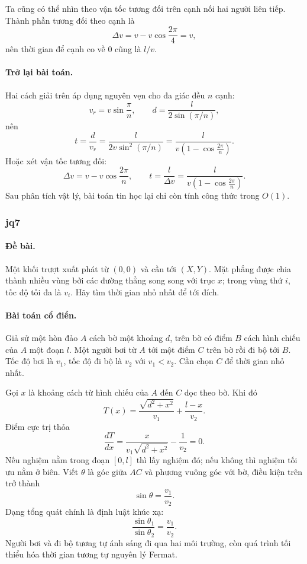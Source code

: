 \documentclass[11pt]{article}
\begin{document}
Ta cũng có thể nhìn theo vận tốc tương đối trên cạnh nối hai người liên tiếp.
Thành phần tương đối theo cạnh là
\[
  \Delta v=v-v\cos\frac{2\pi}{4}=v,
\]
nên thời gian để cạnh co về \(0\) cũng là \(l/v\).

\paragraph{Trở lại bài toán.}
Hai cách giải trên áp dụng nguyên vẹn cho đa giác đều \(n\) cạnh:
\[
  v_r=v\sin\frac{\pi}{n},\qquad
  d=\frac{l}{2\sin(\pi/n)},
\]
nên
\[
  t=\frac{d}{v_r}
    =\frac{l}{2v\sin^2(\pi/n)}
    =\frac{l}{v\left(1-\cos\frac{2\pi}{n}\right)}.
\]
Hoặc xét vận tốc tương đối:
\[
  \Delta v=v-v\cos\frac{2\pi}{n},\qquad
  t=\frac{l}{\Delta v}
    =\frac{l}{v\left(1-\cos\frac{2\pi}{n}\right)}.
\]
Sau phân tích vật lý, bài toán tin học lại chỉ còn tính công thức trong
\(O(1)\).

\subsubsection{jq7}

\paragraph{Đề bài.}
Một khối trượt xuất phát từ \((0,0)\) và cần tới \((X,Y)\). Mặt phẳng được chia
thành nhiều vùng bởi các đường thẳng song song với trục \(x\); trong vùng thứ
\(i\), tốc độ tối đa là \(v_i\). Hãy tìm thời gian nhỏ nhất để tới đích.

\paragraph{Bài toán cổ điển.}
Giả sử một hòn đảo \(A\) cách bờ một khoảng \(d\), trên bờ có điểm \(B\) cách
hình chiếu của \(A\) một đoạn \(l\). Một người bơi từ \(A\) tới một điểm \(C\)
trên bờ rồi đi bộ tới \(B\). Tốc độ bơi là \(v_1\), tốc độ đi bộ là \(v_2\) với
\(v_1<v_2\). Cần chọn \(C\) để thời gian nhỏ nhất.

Gọi \(x\) là khoảng cách từ hình chiếu của \(A\) đến \(C\) dọc theo bờ. Khi đó
\[
  T(x)=\frac{\sqrt{d^2+x^2}}{v_1}+\frac{l-x}{v_2}.
\]
Điểm cực trị thỏa
\[
  \frac{dT}{dx}
  =\frac{x}{v_1\sqrt{d^2+x^2}}-\frac{1}{v_2}=0.
\]
Nếu nghiệm nằm trong đoạn \([0,l]\) thì lấy nghiệm đó; nếu không thì nghiệm tối
ưu nằm ở biên. Viết \(\theta\) là góc giữa \(AC\) và phương vuông góc với bờ,
điều kiện trên trở thành
\[
  \sin\theta=\frac{v_1}{v_2}.
\]
Dạng tổng quát chính là định luật khúc xạ:
\[
  \frac{\sin\theta_1}{\sin\theta_2}=\frac{v_1}{v_2}.
\]
Người bơi và đi bộ tương tự ánh sáng đi qua hai môi trường, còn quá trình tối
thiểu hóa thời gian tương tự nguyên lý Fermat.
\end{document}
